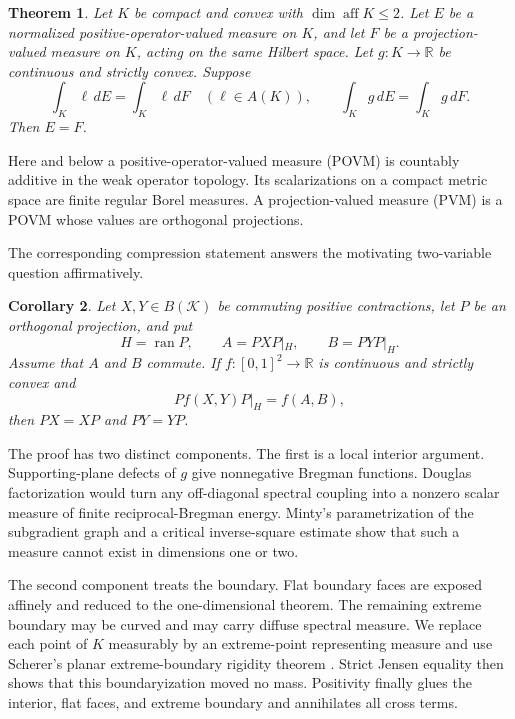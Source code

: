 \documentclass[11pt,a4paper]{amsart}
\newtheorem{theorem}{Theorem}[section]
\newtheorem{corollary}[theorem]{Corollary}
\theoremstyle{remark}
\newcommand{\aff}{\operatorname{aff}}
\newcommand{\ran}{\operatorname{ran}}
\newcommand{\calK}{\mathcal K}
\begin{document}
\begin{theorem}\label{thm:main}
Let \(K\) be compact and convex with \(\dim\aff K\leq 2\).  Let \(E\) be a
normalized positive-operator-valued measure on \(K\), and let \(F\) be a
projection-valued measure on \(K\), acting on the same Hilbert space.  Let
\(g\colon K\to\mathbb R\) be continuous and strictly convex.  Suppose
\[
 \int_K\ell\,dE=\int_K\ell\,dF\quad(\ell\in A(K)),
 \qquad
 \int_Kg\,dE=\int_Kg\,dF.
\]
Then \(E=F\).
\end{theorem}

Here and below a positive-operator-valued measure (POVM) is countably
additive in the weak operator topology.  Its scalarizations on a compact
metric space are finite regular Borel measures.  A projection-valued measure
(PVM) is a POVM whose values are orthogonal projections.

The corresponding compression statement answers the motivating
two-variable question affirmatively.

\begin{corollary}\label{cor:square}
Let \(X,Y\in B(\calK)\) be commuting positive contractions, let \(P\) be an
orthogonal projection, and put
\[
 H=\ran P,\qquad A=PXP|_H,\qquad B=PYP|_H.
\]
Assume that \(A\) and \(B\) commute.  If
\(f\colon[0,1]^2\to\mathbb R\) is continuous and strictly convex and
\[
   P f(X,Y)P|_H=f(A,B),
\]
then \(PX=XP\) and \(PY=YP\).
\end{corollary}

The proof has two distinct components.  The first is a local interior
argument.  Supporting-plane defects of \(g\) give nonnegative Bregman
functions.  Douglas factorization would turn any off-diagonal spectral
coupling into a nonzero scalar measure of finite reciprocal-Bregman energy.
Minty's parametrization of the subgradient graph and a critical
inverse-square estimate show that such a measure cannot exist in dimensions
one or two.

The second component treats the boundary.  Flat boundary faces are exposed
affinely and reduced to the one-dimensional theorem.  The remaining extreme
boundary may be curved and may carry diffuse spectral measure.  We replace
each point of \(K\) measurably by an extreme-point representing measure and
use Scherer's planar extreme-boundary rigidity theorem
\cite{SchererPlanar}.  Strict Jensen equality then shows that this
boundaryization moved no mass.  Positivity finally glues the interior, flat
faces, and extreme boundary and annihilates all cross terms.
\end{document}
